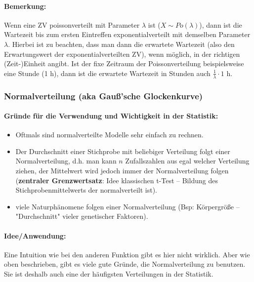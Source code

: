 \documentclass[a4paper]{article}
\begin{document}
\paragraph{Bemerkung:} Wenn eine ZV poissonverteilt mit Parameter $\lambda$ ist ($X \sim Po(\lambda)$), dann ist die Wartezeit bis zum ersten Eintreffen exponentialverteilt mit demselben Parameter $\lambda$. Hierbei ist zu beachten, dass man dann die erwartete Wartezeit (also den Erwartungswert der exponentialverteilten ZV), wenn möglich, in der richtigen (Zeit-)Einheit angibt. Ist der fixe Zeitraum der Poissonverteilung beispielsweise eine Stunde (1 h), dann ist die erwartete Wartezeit in Stunden auch $\frac{1}{\lambda} \cdot 1$ h.\\

\noindent {}

\clearpage

\subsubsection{Normalverteilung (aka Gauß'sche Glockenkurve)} \label{sec:Norm}

\paragraph{Gründe für die Verwendung und Wichtigkeit in der Statistik:}

\begin{itemize}
    \item Oftmals sind normalverteilte Modelle sehr einfach zu rechnen.
    \item Der Durchschnitt einer Stichprobe mit beliebiger Verteilung folgt einer Normalverteilung, d.h. man kann $n$ Zufallszahlen aus egal welcher Verteilung ziehen, der Mittelwert wird jedoch immer der Normalverteilung folgen (\textbf{zentraler Grenzwertsatz}: Idee klassischen t-Test -- Bildung des Stichprobenmittelwerts der normalverteilt ist).
    \item viele Naturphänomene folgen einer Normalverteilung (Bsp: Körpergröße -- "Durchschnitt" vieler genetischer Faktoren).
\end{itemize}

\paragraph{Idee/Anwendung:} Eine Intuition wie bei den anderen Funktion gibt es hier nicht wirklich. Aber wie oben beschrieben, gibt es viele gute Gründe, die Normalverteilung zu benutzen. Sie ist deshalb auch eine der häufigsten Verteilungen in der Statistik.
\end{document}
